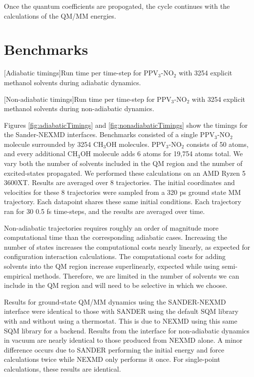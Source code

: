 Once the quantum coefficients are propogated, the cycle continues with
the calculations of the QM/MM energies.

\section{Benchmarks}
    \noindent
    \begin{multiFigure} 
      [Adiabatic timings]{Run time per time-step for PPV\(_3\)-NO\(_2\) with 3254 explicit methanol solvents during adiabatic dynamics.}
      \label{fig:adiabaticTimings}
    \end{multiFigure}\bigskip

    \noindent
    \begin{multiFigure} 
      [Non-adiabatic timings]{Run time per time-step for PPV\(_3\)-NO\(_2\) with 3254 explicit methanol solvents during non-adiabatic dynamics.}
      \label{fig:nonadiabaticTimings}
    \end{multiFigure}\bigskip



Figures \ref{fig:adiabaticTimings} and \ref{fig:nonadiabaticTimings} show the timings for the Sander-NEXMD interfaces. 
Benchmarks consisted of a single PPV\(_3\)-NO\(_2\) molecule surrounded by 3254 CH\(_3\)OH molecules.
PPV\(_3\)-NO\(_2\) consists of 50 atoms, and every additional CH\(_3\)OH molecule adds 6 atoms for 19,754 atoms total.
We vary both the number of solvents included in the QM region and the number of excited-states propagated.
We performed these calculations on an AMD Ryzen 5 3600XT. Results are averaged over 8 trajectories. The initial coordinates and velocities for these 8 trajectories were sampled from a 320 ps ground state MM trajectory. Each datapoint shares these same initial conditions. Each trajectory ran for 30 0.5 fs time-steps, and the results are averaged over time.

Non-adiabatic trajectories requires roughly an order of magnitude more computational time than the corresponding adiabatic cases. Increasing the number of states increases the computational costs nearly linearly, as expected for configuration interaction calculations. The computational costs for adding solvents into the QM region increase superlinearly, expected while using semi-empirical methods. Therefore, we are limited in the number of solvents we can include in the QM region and will need to be selective in which we choose.

Results for ground-state QM/MM dynamics using the SANDER-NEXMD interface were identical to those with SANDER using the default SQM library with and without using a thermostat. This is due to NEXMD using this same SQM library for a backend. Results from the interface for non-adiabatic dynamics in vacuum are nearly identical to those produced from NEXMD alone. A minor difference occurs due to SANDER performing the initial energy and force calculations twice while NEXMD only performs it once. For single-point calculations, these results are identical.
